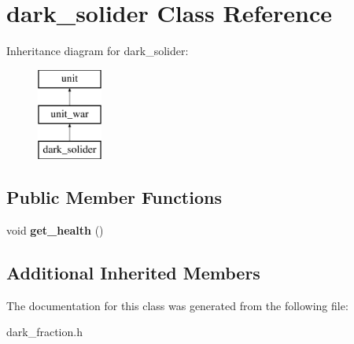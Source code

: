 \hypertarget{classdark__solider}{}\section{dark\+\_\+solider Class Reference}
\label{classdark__solider}
Inheritance diagram for dark\+\_\+solider\+:\begin{figure}[H]
\begin{center}
\leavevmode
\includegraphics[height=3.000000cm]{classdark__solider}
\end{center}
\end{figure}
\subsection*{Public Member Functions}
\begin{DoxyCompactItemize}
\item 
\mbox{\label{classdark__solider_a2d84b45483613bbf6203428246afcb9e}} 
void {\bfseries get\+\_\+health} ()
\end{DoxyCompactItemize}
\subsection*{Additional Inherited Members}


The documentation for this class was generated from the following file\+:\begin{DoxyCompactItemize}
\item 
dark\+\_\+fraction.\+h\end{DoxyCompactItemize}
